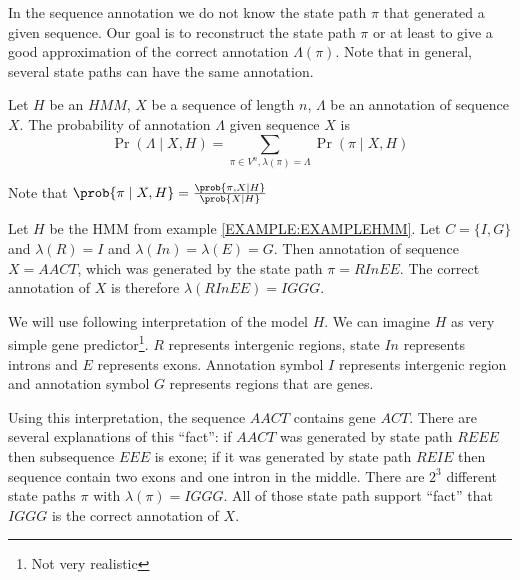 In the sequence annotation we do not know the state path $\pi$ that generated a given
sequence. Our goal is to reconstruct the state path $\pi$ or at least to give a good
approximation of the correct annotation $\Lambda(\pi)$. Note that in general, several state
paths can have the same annotation.


\begin{definition}
Let $H$ be an $HMM$, $X$ be a sequence of length $n$, $\Lambda$ be an annotation of sequence
$X$. The probability of annotation $\Lambda$ given sequence $X$ is 
\begin{equation}
\Pr\left(\Lambda\mid X,H\right)=\sum_{\pi \in V^n,\lambda(\pi) =
\Lambda}\Pr\left(\pi\mid X,H \right)\label{DEF:ANNOTATION:PROBABILITY}
\end{equation}
\end{definition}

Note that $\prob{\pi\mid X,H}=\frac{\prob{\pi,X\mid H}}{\prob{X\mid
H}}$

\begin{example}\label{EXAMPLE:ANNOTATION}
Let $H$ be the HMM from example \ref{EXAMPLE:EXAMPLEHMM}. Let $C=\{I,G\}$ and
$\lambda(R)=I$ and $\lambda(In)=\lambda(E)=G$.  Then annotation of sequence
$X=AACT$, which was generated by the state path $\pi=RInEE$. The correct
annotation of $X$ is therefore  $\lambda(RInEE) =
IGGG$. 

We will use following interpretation of the model $H$. We can imagine $H$ as very simple gene
predictor\footnote{Not very realistic}. $R$ represents intergenic regions, state $In$
represents introns and $E$ represents exons. Annotation symbol $I$ represents
intergenic region and annotation symbol $G$ represents regions that are genes.

Using this interpretation, the sequence $AACT$ contains gene $ACT$. There are
several explanations of this ``fact'': if $AACT$ was generated by state path
$REEE$ then subsequence $EEE$ is exone; if it was generated by state path $REIE$
then sequence contain two exons and one intron in the middle. There are $2^3$
different state paths $\pi$ with $\lambda(\pi)=IGGG$.  All of those state path
support ``fact'' that $IGGG$ is the correct annotation of $X$.

\end{example}




